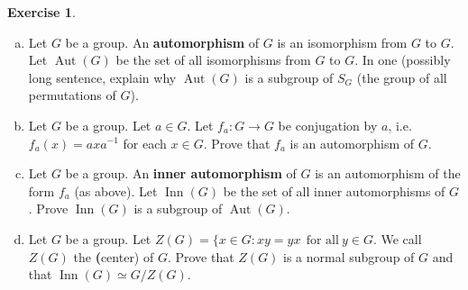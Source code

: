 \documentclass[11pt,oneside]{article}
\numberwithin{equation}{section}
\theoremstyle{definition}
\newtheorem{exercise}{Exercise}
\def\Aut{\operatorname{Aut}}
\def\Inn{\operatorname{Inn}}
\begin{document}
\begin{exercise}
  \begin{enumerate}[(a)]
  \item
    Let $G$ be a group.  An \textbf{automorphism} of $G$ is an
    isomorphism from $G$ to $G$. Let $\Aut(G)$ be the set of all
    isomorphisms from $G$ to $G$. In one (possibly long sentence,
    explain why $\Aut(G)$ is a subgroup of $S_G$ (the group of all permutations of $G$).
  \item
    Let $G$ be a group.  Let $a \in G$.  Let $f_a : G \to G$ be
    conjugation by $a$, i.e. $f_a(x) = a x a^ {-1}$ for each $x \in G$.
    Prove that $f_a$ is an automorphism of $G$.
  \item
    Let $G$ be a group.  An \textbf{inner automorphism} of $G$ is an
    automorphism of the form $f_a$ (as above). Let $\Inn(G) $ be the
    set of all inner automorphisms of $G$. Prove $\Inn(G)$ is a subgroup of
    $ \Aut(G)$.
  \item
    Let $G$ be a group. Let $Z(G) = \{ x \in G : xy = yx \ \ \text{for
      all} \ y \in G$.  We call $Z(G)$ the \textbf(center) of $G$.
    Prove that $Z(G)$ is a normal subgroup of $G$ and that $\Inn(G) \simeq G / Z(G)$.
  \end{enumerate}
\end{exercise}
\end{document}
